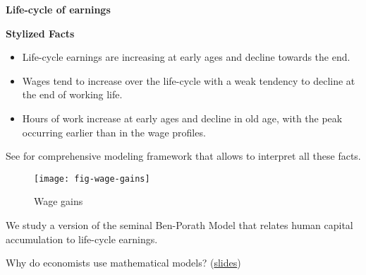 \begin{frame}\begin{center}
		\LARGE\textbf{Life-cycle of earnings}
\end{center}\end{frame}
\begin{frame}\textbf{Stylized Facts}\vspace{0.3cm}

\begin{itemize}\setlength\itemsep{1em}
\item Life-cycle earnings are increasing at early ages and decline towards the end.
\item Wages tend to increase over the life-cycle with a weak tendency to decline at the end of working life.
\item Hours of work increase at early ages and decline in old age, with the peak occurring earlier than in the wage profiles.
\end{itemize}

See  for comprehensive modeling framework that allows to interpret all these facts.
\end{frame}
\begin{frame}
	\begin{figure}[htp]\centering
		\caption{Wage gains}\scalebox{0.35}
		{\texttt{[image: fig-wage-gains]}}
	\end{figure}
\end{frame}
\begin{frame}
We study a version of the seminal Ben-Porath Model \cite{Ben-Porath.1967} that relates human capital accumulation to life-cycle earnings. \\\vspace{1cm}

Why do economists use mathematical models? (\href{https://github.com/HumanCapitalAnalysis/talks/blob/master/distribution/research_skills/02_mathematical_modeling.pdf}{slides})
\end{frame}

